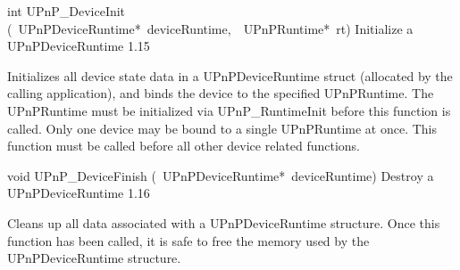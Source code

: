 \documentclass{article}
\begin{document}
\begin{cxxentry}
\begin{cxxfunction}
\begin{cxxdoc}
\end{cxxdoc}
\end{cxxfunction}
\begin{cxxfunction}
{int}
        {UPnP\_DeviceInit}
        {(\ UPnPDeviceRuntime*\ deviceRuntime,\ \ UPnPRuntime*\ rt)}
        {Initialize a UPnPDeviceRuntime }
        {1.15}
\begin{cxxdoc}
Initializes all device state data in a UPnPDeviceRuntime
struct (allocated by the calling application), and binds the
device to the specified UPnPRuntime.  The UPnPRuntime
must be initialized via UPnP\_RuntimeInit before this function
is called.  Only one device may be bound to a single
UPnPRuntime at once.  This function must be called before
all other device related functions.


\end{cxxdoc}
\end{cxxfunction}
\begin{cxxfunction}
{void}
        {UPnP\_DeviceFinish}
        {(\ UPnPDeviceRuntime*\ deviceRuntime)}
        {Destroy a UPnPDeviceRuntime }
        {1.16}
\begin{cxxdoc}
Cleans up all data associated with a UPnPDeviceRuntime structure.
Once this function has been called, it is safe to free the memory used
by the UPnPDeviceRuntime structure.



\end{cxxdoc}
\end{cxxfunction}
\end{cxxentry}
\end{document}

